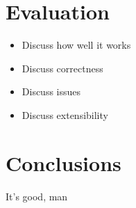 \section{Evaluation}
\begin{itemize}
	\item Discuss how well it works
	\item Discuss correctness
	\item Discuss issues
	\item Discuss extensibility
\end{itemize}

\section{Conclusions}
It's good, man

